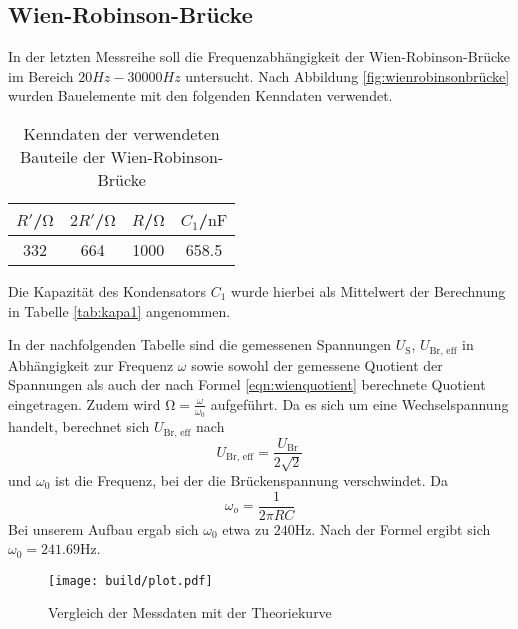 

\subsection{Wien-Robinson-Brücke}
In der letzten Messreihe soll die Frequenzabhängigkeit der Wien-Robinson-Brücke im Bereich $20Hz-30000Hz$ untersucht. Nach Abbildung \ref{fig:wienrobinsonbrücke} wurden Bauelemente mit den folgenden Kenndaten verwendet.

\begin{table}
\centering
\caption{Kenndaten der verwendeten Bauteile der Wien-Robinson-Brücke}
\begin{tabular}{cccc}
	\toprule
$R'$/$\si{\ohm}$& $2R'$/$\si{\ohm}$& $R$/$\si{\ohm}$ &$C_1$/$\si{\nano\farad}$\\
\midrule
332&664&1000&	658.5\\

\end{tabular}
\end{table}
Die Kapazität des Kondensators $C_1$ wurde hierbei als Mittelwert der Berechnung in Tabelle \ref{tab:kapa1} angenommen.

In der nachfolgenden Tabelle sind die gemessenen Spannungen $U_\text{S}$, $U_{\text{Br, eff}}$ in Abhängigkeit zur Frequenz
$\omega$ sowie sowohl der gemessene Quotient der Spannungen als auch der nach
Formel \eqref{eqn:wienquotient} berechnete Quotient eingetragen. Zudem wird $\si{\ohm} =\frac{\omega}{\omega_0}$ aufgeführt.
Da es sich um eine Wechselspannung handelt, berechnet sich $U_{\text{Br, eff}}$ nach
\begin{equation}
	U_{\text{Br, eff}}=\frac{U_{\text{Br}}}{2 \sqrt{2}}
\end{equation}
und $\omega_0$ ist die Frequenz, bei der die Brückenspannung verschwindet.
Da
\begin{equation}
	\omega_o=\frac{1}{2\pi RC}
\end{equation}
Bei unserem Aufbau ergab sich $\omega_0$ etwa zu $240\si{\Hz}$. Nach der Formel ergibt sich $\omega_0=241.69\si{\Hz}$.

\begin{figure}
	\texttt{[image: build/plot.pdf]}
	\caption{Vergleich der Messdaten mit der Theoriekurve}
	\label{fig:plot1}
\end{figure}
